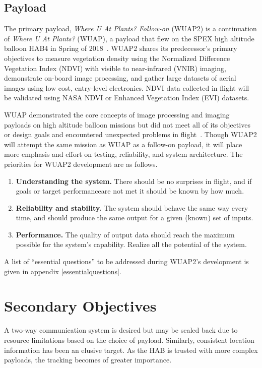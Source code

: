 \documentclass[conference]{IEEEtran} %
\begin{document}
\subsection{Payload}
\label{payloadobjectives}
The primary payload, \textit{Where U At Plants? Follow-on} (WUAP2) is a continuation of \textit{Where U At Plants?} (WUAP), a payload that flew on the SPEX high altitude balloon  HAB4 in Spring of 2018~\cite{wuaphab4}. 
WUAP2 shares its predecessor's primary objectives to measure vegetation density using the Normalized Difference Vegetation Index (NDVI) with visible to near-infrared (VNIR) imaging, demonstrate on-board image processing, and gather large datasets of aerial images using low cost, entry-level electronics. 
NDVI data collected in flight will be validated using NASA NDVI or Enhanced Vegetation Index (EVI) datasets.

WUAP demonstrated the core concepts of image processing and imaging payloads on high altitude balloon missions but did not meet all of its objectives or design goals and encountered unexpected problems in flight~\cite[Post-Flight Analysis]{wuaphab4}. 
Though WUAP2 will attempt the same mission as WUAP as a follow-on payload, it will place more emphasis and effort on testing, reliability, and system architecture. 
The priorities for WUAP2 development are as follows. 
\begin{enumerate}\small
    \item \textbf{Understanding the system.} There should be no surprises in flight, and if goals or target performanceare not met it should be known by how much.
    \item \textbf{Reliability and stability.} The system should behave the same way every time, and should produce the same output for a given (known) set of inputs.
    \item \textbf{Performance.} The quality of output data should reach the maximum possible for the system's capability. Realize all the potential of the system.
\end{enumerate}

A list of ``essential questions'' to be addressed during WUAP2's development is given in appendix \ref{essentialquestions}.


\section{Secondary Objectives}
\label{secondaryobjectives}
A two-way communication system is desired but may be scaled back due to resource limitations based on the choice of payload. 
Similarly, consistent location information has been an elusive target. 
As the HAB is trusted with more complex payloads, the tracking becomes of greater importance.
\end{document}
